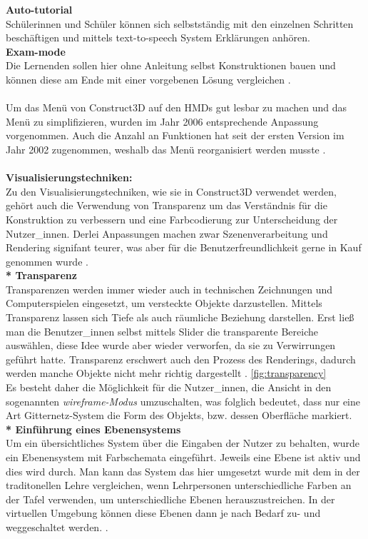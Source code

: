 \documentclass[deutsch]{llncs}
\begin{document}
\textbf{Auto-tutorial} \\
Schülerinnen und Schüler können sich selbstständig mit den einzelnen Schritten beschäftigen und mittels text-to-speech System Erklärungen anhören. \\
\textbf{Exam-mode} \\
Die Lernenden sollen hier ohne Anleitung selbst Konstruktionen bauen und können diese am Ende mit einer vorgebenen Lösung vergleichen \cite{article}. \\
\noindent \\
Um das Menü von Construct3D auf den HMDs gut lesbar zu machen und das Menü zu simplifizieren, wurden im Jahr 2006 entsprechende Anpassung vorgenommen. Auch die Anzahl an Funktionen hat seit  der ersten Version im Jahr 2002 zugenommen, weshalb das Menü reorganisiert werden musste \cite{1667626}. \\
\noindent \\
\textbf{Visualisierungstechniken:} \\
Zu den Visualisierungstechniken, wie sie in Construct3D verwendet werden, gehört auch die Verwendung von Transparenz um das Verständnis für die Konstruktion zu verbessern und eine Farbcodierung zur Unterscheidung der Nutzer\_innen. Derlei Anpassungen machen zwar Szenenverarbeitung und Rendering signifant teurer, was aber für die Benutzerfreundlichkeit gerne in Kauf genommen wurde \cite{1667626}. \\
\textbf{* Transparenz} \\
Transparenzen werden immer wieder auch in technischen Zeichnungen und Computerspielen eingesetzt, um versteckte Objekte darzustellen. Mittels Transparenz lassen sich Tiefe als auch räumliche Beziehung darstellen. Erst ließ man die Benutzer\_innen selbst mittels Slider die transparente Bereiche auswählen, diese Idee wurde aber wieder verworfen, da sie zu Verwirrungen geführt hatte. Transparenz erschwert auch den Prozess des Renderings, dadurch werden manche Objekte nicht mehr richtig dargestellt \cite{1667626}. 
\autoref{fig:transparency} \\
Es besteht daher die Möglichkeit für die Nutzer\_innen, die Ansicht in den sogenannten \emph{wireframe-Modus} umzuschalten, was folglich bedeutet, dass nur eine Art Gitternetz-System die Form des Objekts, bzw. dessen Oberfläche markiert.  
\noindent \\
\textbf{* Einführung eines Ebenensystems} \\
Um ein übersichtliches System über die Eingaben der Nutzer zu behalten, wurde ein Ebenensystem mit Farbschemata eingeführt. Jeweils eine Ebene ist aktiv und dies wird durch. Man kann das System das hier umgesetzt wurde mit dem in der traditonellen Lehre vergleichen, wenn Lehrpersonen unterschiedliche Farben an der Tafel verwenden, um unterschiedliche Ebenen herauszustreichen. In der virtuellen Umgebung können diese Ebenen dann je nach Bedarf zu- und weggeschaltet werden. \cite{1667626}. 
\end{document}

